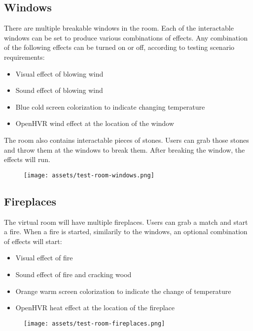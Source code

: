 \hypertarget{x-windows}{\subsection{Windows}}
There are multiple breakable windows in the room. Each of the interactable
windows can be set to produce various combinations of effects. Any combination
of the following effects can be turned on or off, according to testing
scenario requirements:


\begin{itemize}

\item Visual effect of blowing wind

\item Sound effect of blowing wind

\item Blue cold screen colorization to indicate changing temperature

\item OpenHVR wind effect at the location of the window

\end{itemize}


The room also contains interactable pieces of stones. Users can grab those
stones and throw them at the windows to break them. After breaking the window,
the effects will run.


\begin{figure}[h]{}
\centering\texttt{[image: assets/test-room-windows.png]}
\caption{}

\end{figure}

\hypertarget{x-fireplaces}{\subsection{Fireplaces}}
The virtual room will have multiple fireplaces. Users can grab a match and
start a fire. When a fire is started, similarily to the windows, an optional
combination of effects will start:


\begin{itemize}

\item Visual effect of fire

\item Sound effect of fire and cracking wood

\item Orange warm screen colorization to indicate the change of temperature

\item OpenHVR heat effect at the location of the fireplace

\end{itemize}


\begin{figure}[h]{}
\centering\texttt{[image: assets/test-room-fireplaces.png]}
\caption{}

\end{figure}
